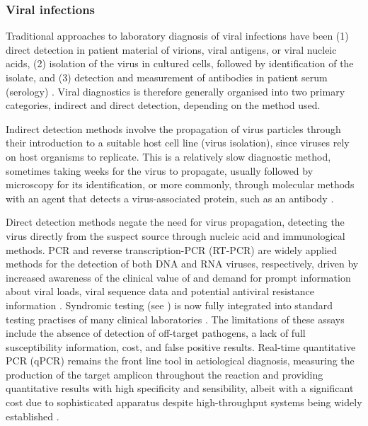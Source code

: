 \subsubsection{Viral infections} \label{sssec:_intro_viral}

Traditional approaches to laboratory diagnosis of viral infections have been (1) direct detection in patient material of virions, viral antigens, or viral nucleic acids, (2) isolation of the virus in cultured cells, followed by identification of the isolate, and (3) detection and measurement of antibodies in patient serum (serology) \citep{burrell_laboratory_2017}. 
Viral diagnostics is therefore generally organised into two primary categories, indirect and direct detection, depending on the method used. 

Indirect detection methods involve the propagation of virus particles through their introduction to a suitable host cell line (virus isolation), since viruses rely on host organisms to replicate. 
This is a relatively slow diagnostic method, sometimes taking weeks for the virus to propagate, usually followed by microscopy for its identification, or more commonly, through molecular methods with an agent that detects a virus-associated protein, such as an antibody \citep{cassedy_virus_2021}. 

Direct detection methods negate the need for virus propagation, detecting the virus directly from the suspect source through nucleic acid and immunological methods. 
PCR and reverse transcription-PCR (RT-PCR) are widely applied methods for the detection of both DNA and RNA viruses, respectively, driven by increased awareness of the clinical value of and demand for prompt information about viral loads, viral sequence data and potential antiviral resistance information \citep{cassedy_virus_2021}. 
Syndromic testing (see ) is now fully integrated into standard testing practises of many clinical laboratories \citep{dien_bard_panels_2020}. 
The limitations of these assays include the absence of detection of off-target pathogens, a lack of full susceptibility information, cost, and false positive results. 
Real-time quantitative PCR (qPCR) remains the front line tool in aetiological diagnosis, measuring the production of the target amplicon throughout the reaction and providing quantitative results with high specificity and sensibility, albeit with a significant cost due to sophisticated apparatus despite high-throughput systems being widely established \citep{cassedy_virus_2021}.


